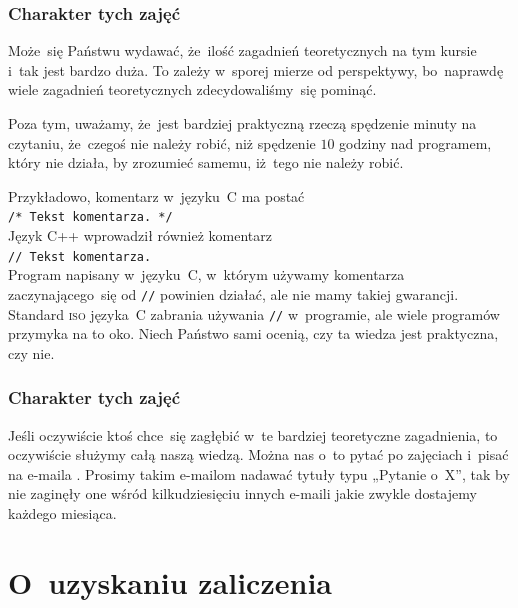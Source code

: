\documentclass[10pt,t]{beamer}
\begin{document}
\begin{frame}
  \frametitle{Charakter tych zajęć}


  Może~się Państwu wydawać, że~ilość zagadnień teoretycznych na tym kursie
  i~tak jest bardzo duża. To zależy w~sporej mierze od perspektywy,
  bo~naprawdę wiele zagadnień teoretycznych zdecydowaliśmy~się pominąć.

  Poza tym, uważamy, że~jest bardziej praktyczną rzeczą spędzenie minuty na
  czytaniu, że~czegoś nie należy robić, niż spędzenie $10$ godziny nad
  programem, który nie działa, by zrozumieć samemu, iż~tego nie należy
  robić.

  Przykładowo, komentarz w~języku~C ma postać \\
  \texttt{/* Tekst komentarza. */} \\
  Język C++ wprowadził również komentarz \\
  \texttt{// Tekst komentarza.} \\
  Program napisany w~języku~C, w~którym używamy komentarza zaczynającego~się
  od \texttt{//} \alert{powinien} działać, ale \alert{nie mamy takiej
    gwarancji}. Standard \textsc{iso} języka~C zabrania używania
  \texttt{//} w~programie, ale wiele programów przymyka na to oko.
  Niech Państwo sami ocenią, czy ta wiedza jest praktyczna, czy nie.

\end{frame}





\begin{frame}
  \frametitle{Charakter tych zajęć}


  Jeśli oczywiście ktoś chce~się zagłębić w~te bardziej teoretyczne
  zagadnienia, to oczywiście służymy całą naszą wiedzą. Można
  nas o~to pytać po zajęciach i~pisać na e-maila \email.
  Prosimy takim e-mailom nadawać tytuły typu „Pytanie o~X”, tak by nie
  zaginęły one wśród kilkudziesięciu innych e-maili jakie zwykle dostajemy
  każdego miesiąca.

\end{frame}










\section{O~uzyskaniu zaliczenia}
\end{document}
